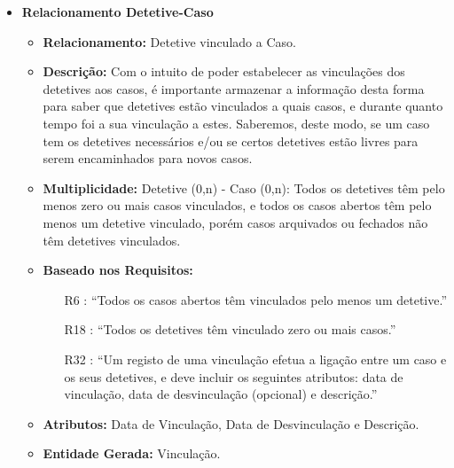 \documentclass[a4paper,12pt]{scrreprt}
\begin{document}
        \begin{itemize}
        \item\textbf{Relacionamento Detetive-Caso}
        \begin{itemize}
            \item\textbf{Relacionamento:} Detetive vinculado a Caso.
            \item\textbf{Descrição:} Com o intuito de poder estabelecer as vinculações dos detetives aos casos, é importante armazenar a informação desta forma para saber que detetives estão vinculados a quais casos, e durante quanto tempo foi a sua vinculação a estes. Saberemos, deste modo, se um caso tem os detetives necessários e/ou se certos detetives estão livres para serem encaminhados para novos casos.
            \item\textbf{Multiplicidade:} Detetive (0,n) - Caso (0,n): Todos os detetives têm pelo menos zero ou mais casos vinculados, e todos os casos abertos têm pelo menos um detetive vinculado, porém casos arquivados ou fechados não têm detetives vinculados.
            \item\textbf{Baseado nos Requisitos:}
            \begin{itemize}
                \item [R6]: “Todos os casos abertos têm vinculados pelo menos um detetive.”
                \item [R18]: “Todos os detetives têm vinculado zero ou mais casos.”
                \item [R32]: “Um registo de uma vinculação efetua a ligação entre um caso e os seus detetives, e deve incluir os seguintes atributos: data de vinculação, data de desvinculação (opcional) e descrição.”
            \end{itemize}
            \item\textbf{Atributos:} Data de Vinculação, Data de Desvinculação e Descrição.
            \item\textbf{Entidade Gerada:} Vinculação.
        \end{itemize}
        
        \clearpage


\end{itemize}
\end{document}
